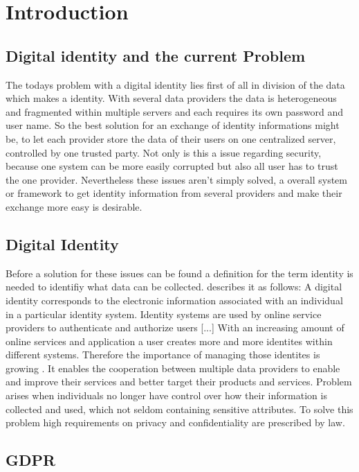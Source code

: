 \chapter{Introduction}
\label{cha:introduction}
\section{Digital identity and the current Problem}

The todays problem with a digital identity lies first of all in division of the data which makes a identity. With several data providers the data is heterogeneous and fragmented within multiple servers and each requires its own password and user name. So the best solution for an exchange of identity informations might be, to let each provider store the data of their users on one centralized server, controlled by one trusted party. Not only is this a issue regarding security, because one system can be more easily corrupted but also all user has to trust the one provider.
Nevertheless these issues aren't simply solved, a overall system or framework to get identity information from several providers and make their exchange more easy is desirable. 

\section{Digital Identity}
Before a solution for these issues can be found a definition for the term identity is needed to identifiy what data can be collected. \cite{digitalIdentityDefinition} describes it as follows: A digital identity corresponds to the electronic information associated with an individual
in a particular identity system. Identity systems are used by online service providers to authenticate and authorize users [...]
With an increasing amount of online services and application a user creates more and more identites within different systems. Therefore the importance of managing those identites is growing \cite{managingIdentity}. 
It enables the cooperation between multiple data providers to enable and improve their services and better target their products and services. Problem arises when individuals no longer have control over how their information is collected and used, which not seldom containing sensitive attributes. To solve this problem high requirements on privacy and confidentiality are prescribed by law.

\section{GDPR}

